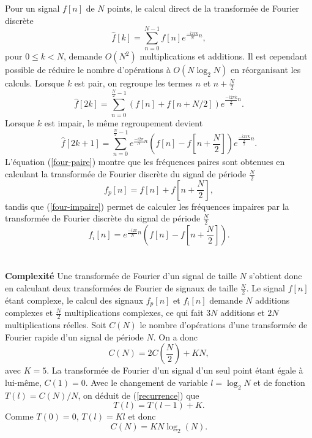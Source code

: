 Pour un signal $f[n]$ de $N$ points, le calcul direct
de la transform\'ee de Fourier discr\`ete
\begin{equation}
{\hat f[k]}  = \sum_{n=0} ^{N-1} f[n] e^{ \frac {-i2 \pi k} N n  } ,
\end{equation}
pour $0 \leq k < N$,
demande $O(N^2)$ multiplications et additions.
Il est cependant possible de
r\'eduire le nombre d'op\'erations \`a $O(N \log_2 N)$
en r\'eorganisant les calculs.
Lorsque $k$ est pair, on regroupe les termes
$n$ et $n+\frac N 2$
\begin{equation}
\label{four-paire}
{\hat f [2k]}  = \sum_{n=0} ^{{\frac N 2}-1} (f[n]+f[n+ N/ 2 ])
e^{ \frac {-i2 \pi k} {{\frac N 2}}n} .
\end{equation}
Lorsque $k$ est impair, le m\^eme regroupement devient
\begin{equation}
\label{four-impaire}
{\hat f [2k+1]}  =
\sum_{n=0} ^{{\frac N 2}-1} e^{ \frac {-i2 \pi} N n}
(f[n]-f[n+{\frac N 2}])
e^{ \frac {-i2 \pi k} {{\frac N 2}} n} .
\end{equation}
L'\'equation (\ref{four-paire})
montre que les fr\'equences paires sont obtenues
en calculant la transform\'ee de Fourier discr\`ete du signal
de p\'eriode ${\frac N 2}$
\[
f_p [n] = f[n] + f[n+{\frac N 2}],
\]
tandis que (\ref{four-impaire})
permet de calculer les fr\'equences impaires par la
transform\'ee de Fourier discr\`ete du signal de p\'eriode ${\frac N 2}$
\[
f_i [n] = e^{ \frac {-i2 \pi} N n}  (f[n] - f[n+{\frac N 2}] ).
\]
\\
\\
{\bf Complexit\'e}
Une transform\'ee de Fourier d'un signal de taille $N$ s'obtient
donc en calculant deux transform\'ees de Fourier de signaux de
taille ${\frac N 2}$.
Le signal $f[n]$ \'etant complexe, le calcul
des signaux $f_p [n]$ et $f_i[n]$
demande
$N$ additions complexes et ${\frac N 2}$ multiplications complexes,
ce qui fait $3N$ additions et $2N$ multiplications r\'eelles.
Soit $C(N)$ le nombre d'op\'erations d'une transform\'ee de Fourier
rapide d'un signal de p\'eriode $N$. On a donc
\begin{equation}
\label{recurrence}
C(N) = 2 C({\frac N 2}) + K N ,
\end{equation}
avec $K = 5$.
La transform\'ee de Fourier d'un signal d'un seul point \'etant
\'egale \`a lui-m\^eme, $C(1) = 0$.
Avec le changement de variable $l = \log_2 N$ et de fonction
$T(l) = C(N)/N$, on d\'eduit de (\ref{recurrence}) que
\[
T(l) = T(l-1) + K .
\]
Comme $T(0) = 0$, $T(l) = Kl$ et donc
\[
C(N) = K N \log_2 (N) .
\]

